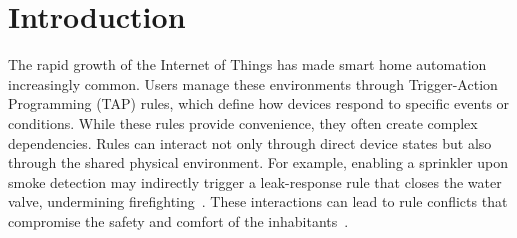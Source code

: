 \section{Introduction}

The rapid growth of the Internet of Things has made smart home automation increasingly common. Users manage these environments through Trigger-Action Programming (TAP) rules, which define how devices respond to specific events or conditions. While these rules provide convenience, they often create complex dependencies. Rules can interact not only through direct device states but also through the shared physical environment. For example, enabling a sprinkler upon smoke detection may indirectly trigger a leak-response rule that closes the water valve, undermining firefighting~\cite{chi2023detecting}. These interactions can lead to rule conflicts that compromise the safety and comfort of the inhabitants~\cite{huang2023survey,trimananda2020understanding,chi2023detecting}.


